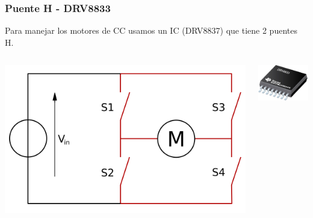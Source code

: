 \documentclass[compress]{beamer}
\begin{document}
\begin{frame}
 \frametitle{Puente H - DRV8833}
Para manejar los motores de CC usamos un IC (DRV8837) que tiene 2 puentes H.
\begin{columns}
\begin{center}
 \includegraphics[width=\columnwidth]{./img/puenteH_1.png}
\end{center}
\begin{center}
 \includegraphics[width=\columnwidth]{./img/drv8833.jpg}
\end{center}

\end{columns}
\end{frame}
\end{document}
